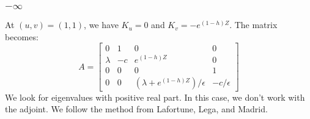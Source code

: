 \documentclass[10pt]{article}
\begin{document}
\subsubsection{$-\infty$}
At $(u,v) = (1,1)$, we have $K_u = 0$ and $K_v = -e^{(1-h)Z}$.
The matrix becomes:
\[
A = \begin{bmatrix}
0 & 1 & 0 & 0 \\
\lambda &  -c  &  e^{(1-h)Z}  & 0 \\
0 & 0 & 0 & 1 \\
0 &  0  &  (\lambda + e^{(1-h)Z})/\epsilon  &  - c / \epsilon
\end{bmatrix}
\]
We look for eigenvalues with positive real part.  In this case, we don't work with the adjoint.
We follow the method from Lafortune, Lega, and Madrid.
\end{document}

